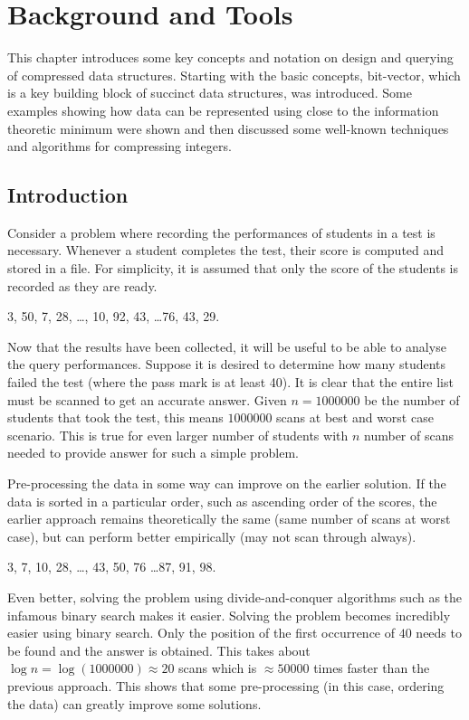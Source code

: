 \chapter{Background and Tools}
This chapter introduces some key concepts and notation on design and querying of compressed data structures. Starting with the basic concepts, bit-vector, which is a key building block of succinct data structures, was introduced. Some examples showing how data can be represented using close to the information theoretic minimum were shown and then discussed some well-known techniques and algorithms for compressing integers.
\section{Introduction}
Consider a problem where recording the performances of students in a test is necessary. Whenever a student completes the test, their score is computed and stored in a file. For simplicity, it is assumed that only the score of the students is recorded as they are ready.
\begin{center}
    3, 50, 7, 28, \ldots, 10, 92, 43, \ldots 76, 43, 29.
\end{center}
Now that the results have been collected, it will be useful to be able to analyse the query performances. Suppose it is desired to determine how many students failed the test (where the pass mark is at least 40). It is clear that the entire list must be scanned to get an accurate answer. Given $n=1000000$ be the number of students that took the test, this means $1000000$ scans at best and worst case scenario. This is true for even larger number of students with $n$ number of scans needed to provide answer for such a simple problem.\par
Pre-processing the data in some way can improve on the earlier solution. If the data is sorted in a particular order, such as ascending order of the scores, the earlier approach remains theoretically the same (same number of scans at worst case), but can perform better empirically (may not scan through always). 
\begin{center}
    3, 7, 10, 28, \ldots, 43, 50, 76 \ldots 87, 91, 98.
\end{center}
Even better, solving the problem using divide-and-conquer algorithms such as the infamous binary search makes it easier. Solving the problem becomes incredibly easier using binary search. Only the position of the first occurrence of $40$ needs to be found and the answer is obtained. This takes about $\log n = \log(1000000) \approx 20$ scans which is $\approx 50000$ times faster than the previous approach. This shows that some pre-processing (in this case, ordering the data) can greatly improve some solutions.\par
